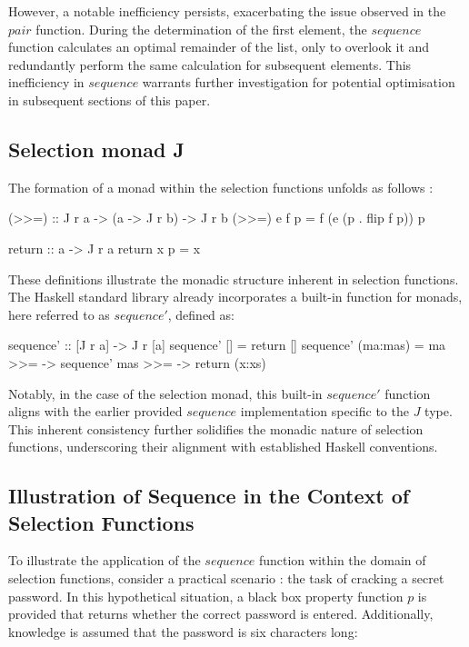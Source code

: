 \documentclass[runningheads]{llncs}
\begin{document}
However, a notable inefficiency persists, exacerbating the issue
observed in the \(pair\) function. During the determination of the first
element, the \(sequence\) function calculates an optimal remainder of
the list, only to overlook it and redundantly perform the same
calculation for subsequent elements. This inefficiency in \(sequence\)
warrants further investigation for potential optimisation in subsequent
sections of this paper.

\subsection{Selection monad J}\label{selection-monad-j}

The formation of a monad within the selection functions unfolds as
follows \cite{escardo2010selection}:

\begin{code}
(>>=) :: J r a -> (a -> J r b) -> J r b
(>>=) e f p = f (e (p . flip f p)) p
\end{code}

\begin{code}
return :: a -> J r a
return x p = x
\end{code}

These definitions illustrate the monadic structure inherent in selection
functions. The Haskell standard library already incorporates a built-in
function for monads, here referred to as \(sequence'\), defined as:

\begin{code}
sequence' :: [J r a] -> J r [a]
sequence' []     = return []
sequence' (ma:mas) = ma >>= 
                    \x -> sequence' mas >>= 
                    \xs -> return (x:xs)
\end{code}

Notably, in the case of the selection monad, this built-in \(sequence'\)
function aligns with the earlier provided \(sequence\) implementation
specific to the \(J\) type. This inherent consistency further solidifies
the monadic nature of selection functions, underscoring their alignment
with established Haskell conventions.

\subsection{Illustration of Sequence in the Context of Selection
Functions}\label{illustration-of-sequence-in-the-context-of-selection-functions}

To illustrate the application of the \(sequence\) function within the
domain of selection functions, consider a practical scenario
\cite{hartmann2022algorithm}: the task of cracking a secret password. In
this hypothetical situation, a black box property function \(p\) is
provided that returns whether the correct password is entered.
Additionally, knowledge is assumed that the password is six characters
long:
\end{document}
